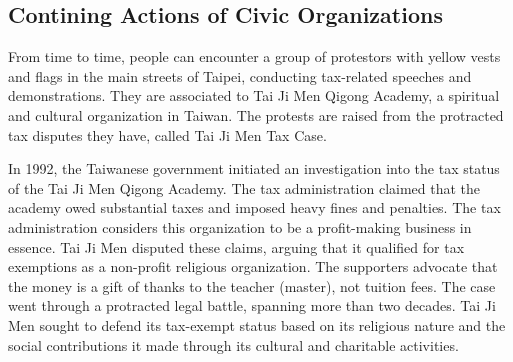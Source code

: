 \documentclass[]{article}
\begin{document}




\subsection{Contining Actions of Civic Organizations}

From time to time, people can encounter a group of protestors with yellow vests and flags in the main streets of Taipei, conducting tax-related speeches and demonstrations. They are associated to Tai Ji Men Qigong Academy, a spiritual and cultural organization in Taiwan. 
The protests are raised from the protracted tax disputes they have, called Tai Ji Men Tax Case.




In 1992, the Taiwanese government initiated an investigation into the tax status of the Tai Ji Men Qigong Academy. The tax administration claimed that the academy owed substantial taxes and imposed heavy fines and penalties. The tax administration considers this organization to be a profit-making business in essence. Tai Ji Men disputed these claims, arguing that it qualified for tax exemptions as a non-profit religious organization. The supporters advocate that the money is a gift of thanks to the teacher (master), not tuition fees.
The case went through a protracted legal battle, spanning more than two decades. Tai Ji Men sought to defend its tax-exempt status based on its religious nature and the social contributions it made through its cultural and charitable activities.
\end{document}
